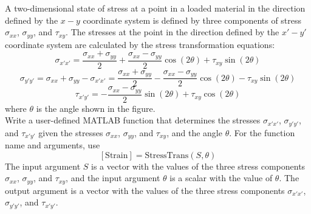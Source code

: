 \documentclass[a4paper, 12pt]{report}
\def\ni{blue!20!white}
\def\link{blue!50!black}
\begin{document}
    \begin{tcolorbox}[title={\color{black}{\section{Q11}}}, colback=white, colframe=\ni, boxrule=1mm, width=1\textwidth]    
        A two-dimensional state of stress at a point in a loaded material in the direction defined by the \( x - y \) coordinate system is defined by three components of stress \( \sigma_{xx} \), \( \sigma_{yy} \), and \( \tau_{xy} \). The stresses at the point in the direction defined by the \( x' - y' \) coordinate system are calculated by the stress transformation equations:
        \[\sigma_{x' x'} = \frac{\sigma_{xx} + \sigma_{yy}}{2} + \frac{\sigma_{xx} - \sigma_{yy}}{2} \cos(2\theta) + \tau_{xy} \sin(2\theta)\]
        \[\sigma_{y' y'}= \sigma_{xx} + \sigma_{yy} - \sigma_{x' x'} = \frac{\sigma_{xx} + \sigma_{yy}}{2} - \frac{\sigma_{xx} - \sigma_{yy}}{2} \cos(2\theta) - \tau_{xy} \sin(2\theta)\]
        \[\tau_{x' y'} = -\frac{\sigma_{xx} - \sigma_{yy}}{2} \sin(2\theta) + \tau_{xy} \cos(2\theta)\]
        where \( \theta \) is the angle shown in the figure.\\[8pt]
        Write a user-defined MATLAB function that determines the stresses \( \sigma_{x' x'} \), \( \sigma_{y' y'} \), and \( \tau_{x' y'} \) given the stresses \( \sigma_{xx} \), \( \sigma_{yy} \), and \( \tau_{xy} \), and the angle \( \theta \). For the function name and arguments, use 
        \[[\text{Strain}] = \text{StressTrans}(S, \theta)\]
        The input argument \( S \) is a vector with the values of the three stress components \( \sigma_{xx} \), \( \sigma_{yy} \), and \( \tau_{xy} \), and the input argument \( \theta \) is a scalar with the value of \( \theta \). The output argument  is a vector with the values of the three stress components \( \sigma_{x' x'} \), \( \sigma_{y' y'} \), and \( \tau_{x' y'} \).
   \end{tcolorbox}
    
\end{document}
